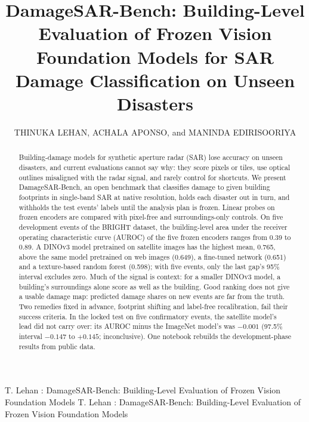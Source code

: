 \documentclass{ieeeaccess}
\begin{document}

\title{DamageSAR-Bench: Building-Level Evaluation of Frozen Vision Foundation Models for SAR Damage Classification on Unseen Disasters}

\author{\uppercase{Thinuka Lehan}, \uppercase{Achala Aponso}, and \uppercase{Maninda Edirisooriya}}
\address[1]{Informatics Institute of Technology (IIT), Colombo, Sri Lanka}

\markboth
{T. Lehan \headeretal: DamageSAR-Bench: Building-Level Evaluation of Frozen Vision Foundation Models}
{T. Lehan \headeretal: DamageSAR-Bench: Building-Level Evaluation of Frozen Vision Foundation Models}


\begin{abstract}
Building-damage models for synthetic aperture radar (SAR) lose accuracy on unseen disasters, and current evaluations cannot say why: they score pixels or tiles, use optical outlines misaligned with the radar signal, and rarely control for shortcuts. We present DamageSAR-Bench, an open benchmark that classifies damage to given building footprints in single-band SAR at native resolution, holds each disaster out in turn, and withholds the test events' labels until the analysis plan is frozen. Linear probes on frozen encoders are compared with pixel-free and surroundings-only controls. On five development events of the BRIGHT dataset, the building-level area under the receiver operating characteristic curve (AUROC) of the five frozen encoders ranges from 0.39 to 0.89. A DINOv3 model pretrained on satellite images has the highest mean, 0.765, above the same model pretrained on web images (0.649), a fine-tuned network (0.651) and a texture-based random forest (0.598); with five events, only the last gap's 95\% interval excludes zero. Much of the signal is context: for a smaller DINOv3 model, a building's surroundings alone score as well as the building. Good ranking does not give a usable damage map: predicted damage shares on new events are far from the truth. Two remedies fixed in advance, footprint shifting and label-free recalibration, fail their success criteria. In the locked test on five confirmatory events, the satellite model's lead did not carry over: its AUROC minus the ImageNet model's was $-0.001$ (97.5\% interval $-0.147$ to $+0.145$; inconclusive). One notebook rebuilds the development-phase results from public data.
\end{abstract}
\end{document}
